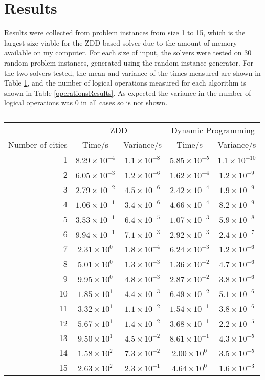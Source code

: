 \documentclass[12pt,a4paper,twoside,openright]{report}
\begin{document}
\section{Results}
Results were collected from problem instances from size 1 to 15, which is the largest size viable for the ZDD based solver due to the amount of memory available on my computer. For each size of input, the solvers were tested on 30 random problem instances, generated using the random instance generator. For the two solvers tested, the mean and variance of the times measured are shown in Table \ref{timeResults}, and the number of logical operations measured for each algorithm is shown in Table \ref{operationsResults}. As expected the variance in the number of logical operations was $0$ in all cases so is not shown.

\begin{table}[h]
\centering
\begin{tabular}[h]{r | c c | c c}
 & \multicolumn{2}{|c|}{ZDD} & \multicolumn{2}{|c}{Dynamic Programming} \\
\parbox[b]{1.5cm}{Number of cities} & Time/s & Variance/s & Time/s & Variance/s \\
  & $8.29\times 10^{-4}$ & $1.1\times 10^{-8}$ & $5.85\times 10^{-5}$ & $1.1\times 10^{-10}$ \\
2  & $6.05\times 10^{-3}$ & $1.2\times 10^{-6}$ & $1.62\times 10^{-4}$ & $1.2\times 10^{-9}$ \\
3  & $2.79\times 10^{-2}$ & $4.5\times 10^{-6}$ & $2.42\times 10^{-4}$ & $1.9\times 10^{-9}$ \\
4  & $1.06\times 10^{-1}$ & $3.4\times 10^{-6}$ & $4.66\times 10^{-4}$ & $8.2\times 10^{-9}$ \\
5  & $3.53\times 10^{-1}$ & $6.4\times 10^{-5}$ & $1.07\times 10^{-3}$ & $5.9\times 10^{-8}$ \\
6  & $9.94\times 10^{-1}$ & $7.1\times 10^{-3}$ & $2.92\times 10^{-3}$ & $2.4\times 10^{-7}$ \\
7  & $2.31\times 10^{0}$ & $1.8\times 10^{-4}$ & $6.24\times 10^{-3}$ & $1.2\times 10^{-6}$ \\
8  & $5.01\times 10^{0}$ & $1.3\times 10^{-3}$ & $1.36\times 10^{-2}$ & $4.7\times 10^{-6}$ \\
9  & $9.95\times 10^{0}$ & $4.8\times 10^{-3}$ & $2.87\times 10^{-2}$ & $3.8\times 10^{-6}$ \\
10 & $1.85\times 10^{1}$ & $4.4\times 10^{-3}$ & $6.49\times 10^{-2}$ & $5.1\times 10^{-6}$ \\
11 & $3.32\times 10^{1}$ & $1.1\times 10^{-2}$ & $1.54\times 10^{-1}$ & $3.8\times 10^{-6}$ \\
12 & $5.67\times 10^{1}$ & $1.4\times 10^{-2}$ & $3.68\times 10^{-1}$ & $2.2\times 10^{-5}$ \\
13 & $9.50\times 10^{1}$ & $4.5\times 10^{-2}$ & $8.61\times 10^{-1}$ & $4.3\times 10^{-5}$ \\
14 & $1.58\times 10^{2}$ & $7.3\times 10^{-2}$ & $2.00\times 10^{0}$ & $3.5\times 10^{-5}$ \\
15 & $2.63\times 10^{2}$ & $2.3\times 10^{-1}$ & $4.64\times 10^{0}$ & $1.6\times 10^{-3}$
\end{tabular}
\caption{}
\label{timeResults}
\end{table}
\end{document}
